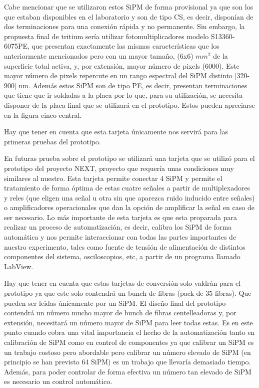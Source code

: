 Cabe mencionar que se utilizaron estos SiPM de forma provisional ya que son los que estaban disponibles en el laboratorio y son de tipo CS, es decir, disponían de dos terminaciones para una conexión rápida y no permanente. Sin embargo, la propuesta final de tritium sería utilizar fotomultiplicadores modelo S13360-6075PE,  que presentan exactamente las mismas características que los anteriormente mencionados pero con un mayor tamaño, (6x6) $mm^2$ de la superficie total activa, y, por extensión, mayor número de pixels (6000). Este mayor número de pixels repercute en un rango espectral del SiPM distinto [320-900] nm. Además estos SiPM son de tipo PE, es decir, presentan terminaciones que tiene que ir soldadas a la placa por lo que, para su utilización, se necesita disponer de la placa final que se utilizará en el prototipo. Estos pueden apreciarse en la figura cinco central.



Hay que tener en cuenta que esta tarjeta únicamente nos servirá para las primeras pruebas del prototipo. 

En futuras prueba sobre el prototipo se utilizará una tarjeta que se utilizó para el prototipo del proyecto NEXT, proyecto que requería unas condiciones muy similares al nuestro. Esta tarjeta permite conectar 4 SiPM y permite el tratamiento de forma óptima de estas cuatre señales a partir de multiplexadores y reles (que eligen una señal u otra sin que aparezca ruido inducido entre señales) o amplificadores operacionales que dan la opción de amplificar la señal en caso de ser necesario. Lo más importante de esta tarjeta es que esta proparada para realizar un proceso de automatización, es decir, calibra los SiPM de forma automática y nos permite interaccionar con todas las partes importantes de nuestro experimento, tales como fuente de tensión de alimentación de distintos componentes del sistema, osciloscopios, etc, a partir de un programa llamado LabView.

Hay que tener en cuenta que estas tarjetas de conversión solo valdrán para el prototipo ya que este solo contendrá un bunch de fibras (pack de 35 fibras). Que pueden ser leidas únicamente por un SiPM. El diseño final del prototipo contendrá un número mucho mayor de bunch de fibras centelleadoras y, por extensión, necesitará un número mayor de SiPM para leer todas estas. Es en este punto cuando cobra una vital importancia el hecho de la automatización tanto en calibración de SiPM como en control de componentes ya que calibrar un SiPM es un trabajo costoso pero abordable pero calibrar un número elevado de SiPM (en principio se han previsto 64 SiPM) es un trabajo que llevaría demasiado tiempo. Además, para poder controlar de forma efectiva un número tan elevado de SiPM es necesario un control automático. 

